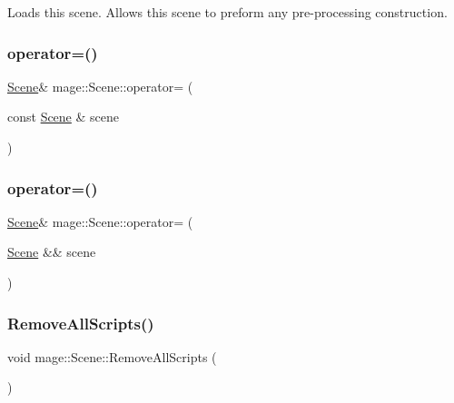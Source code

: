 Loads this scene. Allows this scene to preform any pre-\/processing construction. \hypertarget{classmage_1_1_scene_a2c25c0fedc0230771d8c00a8288a69ce}{}\label{classmage_1_1_scene_a2c25c0fedc0230771d8c00a8288a69ce} 
\subsubsection{\texorpdfstring{operator=()}{operator=()}\hspace{0.1cm}{\footnotesize\ttfamily [1/2]}}
{\footnotesize\ttfamily \hyperlink{classmage_1_1_scene}{Scene}\& mage\+::\+Scene\+::operator= (\begin{DoxyParamCaption}\item[{const \hyperlink{classmage_1_1_scene}{Scene} \&}]{scene }\end{DoxyParamCaption})\hspace{0.3cm}{\ttfamily [delete]}}

\hypertarget{classmage_1_1_scene_a400926762670c9cd9b6d456291600f53}{}\label{classmage_1_1_scene_a400926762670c9cd9b6d456291600f53} 
\subsubsection{\texorpdfstring{operator=()}{operator=()}\hspace{0.1cm}{\footnotesize\ttfamily [2/2]}}
{\footnotesize\ttfamily \hyperlink{classmage_1_1_scene}{Scene}\& mage\+::\+Scene\+::operator= (\begin{DoxyParamCaption}\item[{\hyperlink{classmage_1_1_scene}{Scene} \&\&}]{scene }\end{DoxyParamCaption})\hspace{0.3cm}{\ttfamily [delete]}}

\hypertarget{classmage_1_1_scene_af610ef656fa46cb88638f1356ecee6a8}{}\label{classmage_1_1_scene_af610ef656fa46cb88638f1356ecee6a8} 
\subsubsection{\texorpdfstring{Remove\+All\+Scripts()}{RemoveAllScripts()}}
{\footnotesize\ttfamily void mage\+::\+Scene\+::\+Remove\+All\+Scripts (\begin{DoxyParamCaption}{ }\end{DoxyParamCaption})\hspace{0.3cm}{\ttfamily [noexcept]}}


